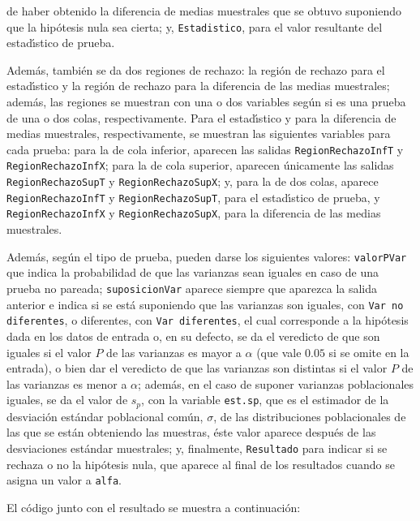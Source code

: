 \begin{solucion}
 de haber obtenido la diferencia de medias muestrales
 que se obtuvo suponiendo que la hip\'otesis nula sea cierta;
 y, \texttt{Estadistico}, para el valor resultante
 del estad\'{\i}stico de prueba.
 \par 
 Adem\'as, tambi\'en se da dos regiones de rechazo:
 la regi\'on de rechazo para el estad\'{\i}stico
 y la regi\'on de rechazo para la diferencia de las medias
 muestrales; adem\'as, las regiones se muestran
 con una o dos variables seg\'un si es una prueba
 de una o dos colas, respectivamente.
 Para el estad\'{\i}stico y para la diferencia de medias
 muestrales, respectivamente, se muestran las siguientes variables
 para cada prueba:
 para la de cola inferior, aparecen las salidas
 \texttt{RegionRechazoInfT} y \texttt{RegionRechazoInfX};
 para la de cola superior, aparecen \'unicamente las salidas
 \texttt{RegionRechazoSupT} y \texttt{RegionRechazoSupX};
 y, para la de dos colas, aparece \texttt{RegionRechazoInfT}
 y \texttt{RegionRechazoSupT}, para el estad\'{\i}stico de prueba,
 y \texttt{RegionRechazoInfX} y \texttt{RegionRechazoSupX},
 para la diferencia de las medias muestrales.
 \par 
 Adem\'as, seg\'un el tipo de prueba, pueden darse
 los siguientes valores:
 \texttt{valorPVar} que indica la probabilidad
 de que las varianzas sean iguales en caso de una prueba
 no pareada;
 \texttt{suposicionVar} aparece siempre que aparezca la salida
 anterior e indica si se est\'a suponiendo
 que las varianzas son iguales, con \texttt{Var no diferentes},
 o diferentes, con \texttt{Var diferentes},
 el cual corresponde a la hip\'otesis dada en los datos de entrada
 o, en su defecto, se da el veredicto de que son iguales
 si el valor $P$ de las varianzas es mayor a $\alpha$
 (que vale $0.05$ si se omite en la entrada),
 o bien dar el veredicto de que las varianzas son distintas
 si el valor $P$ de las varianzas es menor a $\alpha$;
 adem\'as, en el caso de suponer varianzas poblacionales iguales,
 se da el valor de $s_p$, con la variable \texttt{est.sp},
 que es el estimador de la desviaci\'on est\'andar poblacional
 com\'un, $\sigma$, de las distribuciones poblacionales
 de las que se est\'an obteniendo las muestras, 
 \'este valor aparece despu\'es de las desviaciones est\'andar
 muestrales;
 y, finalmente, \texttt{Resultado} para indicar si se rechaza o no
 la hip\'otesis nula, que aparece al final de los resultados
 cuando se asigna un valor a \texttt{alfa}.
 \par 
 El c\'odigo junto con el resultado se muestra a continuaci\'on:
 \begin{verbatim}

\end{verbatim}
\end{solucion}
